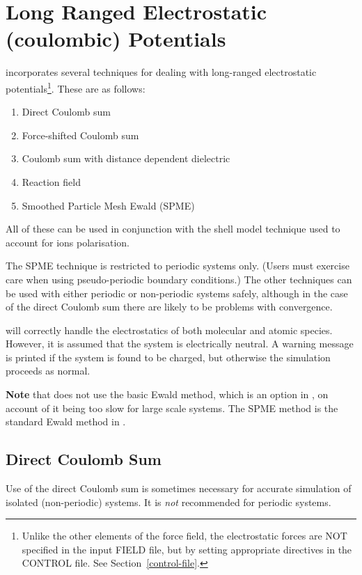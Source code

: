 \section{Long Ranged Electrostatic (coulombic) Potentials}
\label{coulomb}

\D incorporates several techniques for dealing with long-ranged
electrostatic potentials\footnote{Unlike the
other elements of the force field, the electrostatic forces are
NOT specified in the input FIELD file, but by setting appropriate
directives in the CONTROL file. See Section~\ref{control-file}.}.
These are as follows:
\begin{enumerate}
\item Direct Coulomb sum
\item Force-shifted Coulomb sum
\item Coulomb sum with distance dependent dielectric
\item Reaction field
\item Smoothed Particle Mesh Ewald (SPME)
\end{enumerate}
All of these can be used in conjunction with the shell
model technique used to
account for ions polarisation.

The SPME technique is restricted to periodic systems only. (Users
must exercise care when using pseudo-periodic boundary
conditions.)  The other techniques can
be used with either periodic or non-periodic systems safely,
although in the case of the direct Coulomb sum there are likely to be problems with convergence.

\D will correctly handle the electrostatics of both molecular and
atomic species.  However, it is assumed that the system is
electrically neutral.  A warning message is printed if the system
is found to be charged, but otherwise the simulation proceeds as
normal.

{\bf Note} that \D does not use the basic Ewald method, which is an
option in \C, on account of it being too slow for large
scale systems.  The SPME method is the standard Ewald method in \D.

\subsection{Direct Coulomb Sum}

Use of the direct Coulomb sum is
sometimes necessary for accurate simulation of isolated
(non-periodic) systems.  It is {\em not} recommended for periodic
systems.

